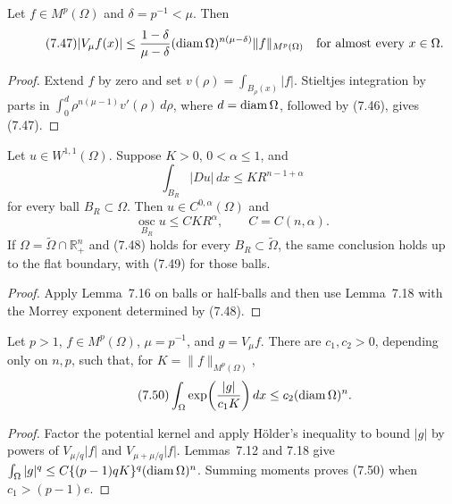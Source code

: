 \begin{lemma}
\label{gt:lem-sobolev-morrey-potential-bound}
Let $f\in M^p(\Omega)$ and $\delta=p^{-1}<\mu$. Then
\begin{equation}
\tag{7.47}
|V_\mu f(x)|\leq
\frac{1-\delta}{\mu-\delta}
(\operatorname{diam}\Omega)^{n(\mu-\delta)}\|f\|_{M^p(\Omega)}
\quad\text{for almost every }x\in\Omega.
\end{equation}
\end{lemma}
\begin{proof}
\sketch Extend $f$ by zero and set
$v(\rho)=\int_{B_\rho(x)}|f|$. Stieltjes integration by parts in
$\int_0^d\rho^{n(\mu-1)}v'(\rho)\,d\rho$, where
$d=\operatorname{diam}\Omega$, followed by (7.46), gives (7.47).
\end{proof}

\begin{theorem}
\label{gt:thm-sobolev-morrey-growth}
Let $u\in W^{1,1}(\Omega)$. Suppose $K>0$, $0<\alpha\leq1$, and
\begin{equation}
\tag{7.48}
\int_{B_R}|Du|\,dx\leq KR^{n-1+\alpha}
\end{equation}
for every ball $B_R\subset\Omega$. Then $u\in C^{0,\alpha}(\Omega)$ and
\begin{equation}
\tag{7.49}
\operatorname*{osc}_{B_R}u\leq C K R^\alpha,
\qquad C=C(n,\alpha).
\end{equation}
If $\Omega=\widetilde\Omega\cap\mathbb R_+^n$ and (7.48) holds for every
$B_R\subset\widetilde\Omega$, the same conclusion holds up to the flat
boundary, with (7.49) for those balls.
\end{theorem}
\begin{proof}
\sketch Apply Lemma~7.16 on balls or half-balls and then use Lemma~7.18 with
the Morrey exponent determined by (7.48).
\end{proof}

\begin{lemma}
\label{gt:lem-sobolev-morrey-potential-exponential}
Let $p>1$, $f\in M^p(\Omega)$, $\mu=p^{-1}$, and $g=V_\mu f$. There are
$c_1,c_2>0$, depending only on $n,p$, such that, for
$K=\|f\|_{M^p(\Omega)}$,
\begin{equation}
\tag{7.50}
\int_\Omega\exp\!\left(\frac{|g|}{c_1K}\right)dx
\leq c_2(\operatorname{diam}\Omega)^n.
\end{equation}
\end{lemma}
\begin{proof}
\sketch Factor the potential kernel and apply H\"older's inequality to bound $|g|$ by
powers of $V_{\mu/q}|f|$ and $V_{\mu+\mu/q}|f|$. Lemmas~7.12 and 7.18 give
$\int_\Omega|g|^q\leq C\{(p-1)qK\}^q(\operatorname{diam}\Omega)^n$. Summing moments proves
(7.50) when $c_1>(p-1)e$.
\end{proof}

